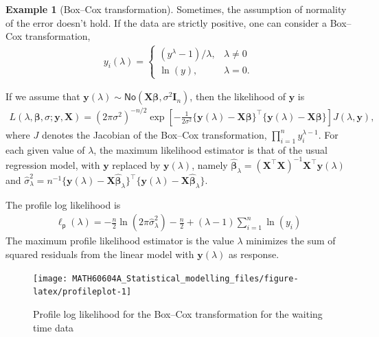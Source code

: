 \documentclass[
  11pt,
  letterpaper,
]{book}
\theoremstyle{definition}
\theoremstyle{definition}
\newtheorem{example}{Example}[chapter]
\theoremstyle{definition}
\theoremstyle{definition}
\theoremstyle{remark}
\begin{document}
\begin{example}[Box--Cox transformation]
\protect\hypertarget{exm:boxcox}{}{\label{exm:boxcox} {} }Sometimes, the assumption of normality of the error doesn't hold. If the data are strictly positive, one can consider a Box--Cox transformation,
\begin{align*}
y_i(\lambda)= \begin{cases}
(y^{\lambda}-1)/\lambda, & \lambda \neq 0\\
\ln(y), & \lambda=0.
\end{cases}
\end{align*}

If we assume that \(\boldsymbol{y}(\lambda) \sim \mathsf{No}(\mathbf{X}\boldsymbol{\beta}, \sigma^2 \mathbf{I}_n)\), then the likelihood of \(\boldsymbol{y}\) is
\begin{align*}
L(\lambda, \boldsymbol{\beta}, \sigma; \boldsymbol{y}, \mathbf{X}) = (2\pi\sigma^2)^{-n/2}\exp \left[ - \frac{1}{2\sigma^2}\{\boldsymbol{y}(\lambda) - \mathbf{X}\boldsymbol{\beta}\}^\top\{\boldsymbol{y}(\lambda) - \mathbf{X}\boldsymbol{\beta}\}\right] J(\lambda, \boldsymbol{y}),
\end{align*}
where \(J\) denotes the Jacobian of the Box--Cox transformation, \(\prod_{i=1}^n y_i^{\lambda-1}\).
For each given value of \(\lambda\), the maximum likelihood estimator is that of the usual regression model, with \(\boldsymbol{y}\) replaced by \(\boldsymbol{y}(\lambda)\), namely \(\widehat{\boldsymbol{\beta}}_\lambda = (\mathbf{X}^\top\mathbf{X})^{-1}\mathbf{X}^\top \boldsymbol{y}(\lambda)\) and \(\widehat{\sigma}^2_\lambda = n^{-1}\{ \boldsymbol{y}(\lambda) - \mathbf{X}\widehat{\boldsymbol{\beta}}_\lambda\}^\top\{ \boldsymbol{y}(\lambda) - \mathbf{X}\widehat{\boldsymbol{\beta}}_\lambda\}\).

The profile log likelihood is
\begin{align*}
\ell_{\mathsf{p}}(\lambda) = -\frac{n}{2}\ln(2\pi \widehat{\sigma}^2_\lambda) - \frac{n}{2} + (\lambda - 1)\sum_{i=1}^n \ln(y_i)
\end{align*}
The maximum profile likelihood estimator is the value \(\lambda\) minimizes the sum of squared residuals from the linear model with \(\boldsymbol{y}(\lambda)\) as response.
\end{example}

\begin{figure}

{\centering \texttt{[image: MATH60604A\_Statistical\_modelling\_files/figure-latex/profileplot-1]} 

}

\caption{Profile log likelihood for the Box--Cox transformation for the waiting time data}\label{fig:profileplot}
\end{figure}
\end{document}
